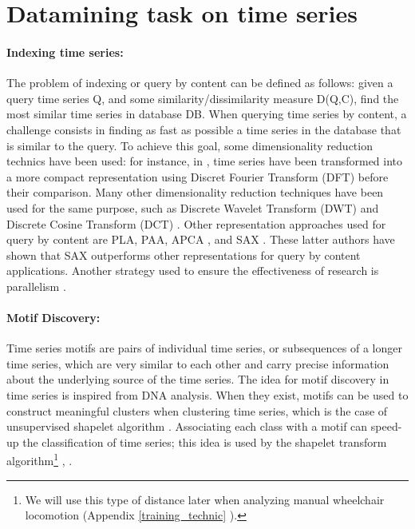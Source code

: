 \section{Datamining task on time series}
\paragraph{Indexing time series: }
The problem of indexing or query by content can be defined as follows: given a query time series Q, and some similarity/dissimilarity measure D(Q,C), find the most similar time series in database DB. When querying time series by content, a challenge consists in finding as fast as possible a time series in the database that is similar to the query. To achieve this goal, some dimensionality reduction technics have been used:  for instance, in \cite{Agrawal1993}, time series have been transformed into a more compact representation using Discret Fourier Transform (DFT) before their comparison. Many other dimensionality reduction techniques have been used for the same purpose, such as Discrete Wavelet Transform (DWT) and Discrete Cosine Transform (DCT) \cite{chan1999efficient}. Other representation approaches used for query by content are PLA, PAA, APCA \cite{keogh2001locally}, and SAX \cite{Lin2007}. These latter authors \cite{Lin2007}  have shown that SAX outperforms other representations for query by content applications. Another strategy used to ensure the effectiveness of research is parallelism \cite{yagoubi2017radiussketch}.

\paragraph{Motif Discovery:}
Time series motifs are pairs of individual time series, or subsequences of a longer time series, which are very similar to each other and carry precise information about the underlying source of the time series. The idea for motif discovery in time series is inspired from DNA analysis. When they exist, motifs can be used to construct meaningful clusters when clustering time series, which is the case of unsupervised shapelet algorithm \cite{ulanova2015scalable}. Associating each class with a motif can speed-up the classification of time series; this idea is used by the shapelet transform algorithm\footnote{We will use this type of distance later when analyzing manual wheelchair locomotion (Appendix  \ref{training_technic} ).} \cite{lines2012shapelet}, \cite{yagoubi2018parcorr}.

